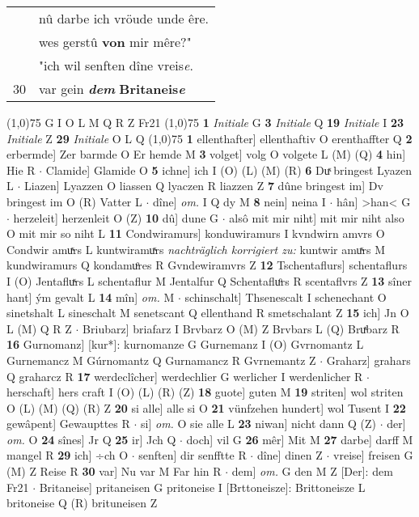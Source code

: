\documentclass[8pt,a4paper,notitlepage]{article}
\begin{document}
\begin{table}[ht]
\begin{minipage}[t]{0.5\linewidth}
\begin{tabular}{rl}
 & nû darbe ich vröude unde êre.\\ 
 & wes gerstû \textbf{von} mir mêre?"\\ 
 & "ich wil senften dîne vreis\textit{e}.\\ 
30 & var gein \textit{\textbf{dem}} \textbf{Britaneis\textit{e}}\\ 
\end{tabular}
\scriptsize
\line(1,0){75} \newline
G I O L M Q R Z Fr21 \newline
\line(1,0){75} \newline
\textbf{1} \textit{Initiale} G  \textbf{3} \textit{Initiale} Q  \textbf{19} \textit{Initiale} I  \textbf{23} \textit{Initiale} Z  \textbf{29} \textit{Initiale} O L Q  \newline
\line(1,0){75} \newline
\textbf{1} ellenthafter] ellenthaftiv O erenthaffter Q \textbf{2} erbermde] Zer barmde O Er hemde M \textbf{3} volget] volg O volgete L (M) (Q) \textbf{4} hin] Hie R  $\cdot$ Clamide] Glamide O \textbf{5} ichne] ich I (O) (L) (M) (R) \textbf{6} Duͯ bringest Lyazen L  $\cdot$ Liazen] Lyazzen O liassen Q lyaczen R liazzen Z \textbf{7} dûne bringest im] Dv bringest im O (R) Vatter L  $\cdot$ dîne] \textit{om.} I Q dy M \textbf{8} nein] neina I  $\cdot$ hân] >han< G  $\cdot$ herzeleit] herzenleit O (Z) \textbf{10} dû] dune G  $\cdot$ alsô mit mir niht] mit mir niht also O mit mir so niht L \textbf{11} Condwiramurs] konduwiramurs I kvndwirn amvrs O Condwir amuͯrs L kuntwiramuͯrs \textit{nachträglich korrigiert zu:} kuntwir amuͯrs M kundwiramurs Q kondamuͦres R Gvndewiramvrs Z \textbf{12} Tschentaflurs] schentaflurs I (O) Jentafluͯrs L schentaflur M Jentalfur Q Schentafluͦrs R scentaflvrs Z \textbf{13} sîner hant] ým gevalt L \textbf{14} mîn] \textit{om.} M  $\cdot$ schinschalt] Thsenescalt I schenechant O sinetshalt L sineschalt M senetscant Q ellenthand R smetschalant Z \textbf{15} ich] Jn O L (M) Q R Z  $\cdot$ Briubarz] briafarz I Brvbarz O (M) Z Brvbars L (Q) Bruͯbarz R \textbf{16} Gurnomanz] [kur*]: kurnomanze G Gurnemanz I (O) Gvrnomantz L Gurnemancz M Gúrnomantz Q Gurnamancz R Gvrnemantz Z  $\cdot$ Graharz] grahars Q graharcz R \textbf{17} werdeclîcher] werdechlier G werlicher I werdenlicher R  $\cdot$ herschaft] hers craft I (O) (L) (R) (Z) \textbf{18} guote] guten M \textbf{19} striten] wol striten O (L) (M) (Q) (R) Z \textbf{20} si alle] alle si O \textbf{21} vünfzehen hundert] wol Tusent I \textbf{22} gewâpent] Gewaupttes R  $\cdot$ si] \textit{om.} O sie alle L \textbf{23} niwan] nicht dann Q (Z)  $\cdot$ der] \textit{om.} O \textbf{24} sînes] Jr Q \textbf{25} ir] Jch Q  $\cdot$ doch] vil G \textbf{26} mêr] Mit M \textbf{27} darbe] darff M mangel R \textbf{29} ich] ÷ch O  $\cdot$ senften] dir senfftte R  $\cdot$ dîne] dinen Z  $\cdot$ vreise] freisen G (M) Z Reise R \textbf{30} var] Nu var M Far hin R  $\cdot$ dem] \textit{om.} G den M Z [Der]: dem Fr21  $\cdot$ Britaneise] pritaneisen G pritoneise I [Brttoneisze]: Brittoneisze L britoneise Q (R) brituneisen Z \newline

\end{minipage}
\end{table}
\end{document}
